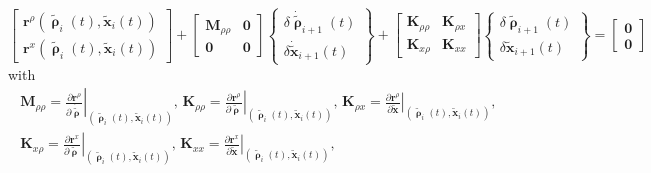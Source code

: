 \documentclass[11pt]{acmeArticle}
\numberwithin{equation}{section}
\begin{document}
\begin{equation}
	\left[
		\begin{array}{c}
			\mathbf{r}^\rho(\tilde{\pmb\uprho}_i(t), \tilde{\mathbf{x}}_i(t))\\
			\mathbf{r}^x(\tilde{\pmb\uprho}_i(t), \tilde{\mathbf{x}}_i(t))
		\end{array}
	\right]
	+
	\left[
	\begin{array}{cc}
		\mathbf{M}_{\rho\rho} & \mathbf{0}\\
		\mathbf{0} & \mathbf{0}
	\end{array}
	\right]
	\left\{
		\begin{array}{c}
		\delta\dot{\tilde{\pmb\uprho}}_{i+1}(t)\\
		\delta\dot{\tilde{\mathbf{x}}}_{i+1}(t)
		\end{array}
	\right\}
	+
	\left[
		\begin{array}{cc}
			\mathbf{K}_{\rho\rho} & \mathbf{K}_{\rho x}\\
			\mathbf{K}_{x\rho} & \mathbf{K}_{xx}
		\end{array}
		\right]
		\left\{
			\begin{array}{c}
			\delta\tilde{\pmb\uprho}_{i+1}(t)\\
			\delta\tilde{\mathbf{x}}_{i+1}(t)
			\end{array}
		\right\}
		=
		\left[
			\begin{array}{c}
				\mathbf{0}\\
				\mathbf{0}
			\end{array}
		\right]
		\label{eq:tangent_remodelling}
\end{equation}
with
\begin{equation}
\begin{split}
\mathbf{M}_{\rho\rho} = 
\left.
\frac{\partial \mathbf{r}^\rho}{\partial \dot{\tilde{\pmb\uprho}}}
\right|_{(\tilde{\pmb\uprho}_i(t),\tilde{\mathbf{x}}_i(t))},\,
\mathbf{K}_{\rho\rho} = 
\left.
\frac{\partial \mathbf{r}^\rho}{\partial {\tilde{\pmb\uprho}}}
\right|_{(\tilde{\pmb\uprho}_i(t),\tilde{\mathbf{x}}_i(t))},\,
\mathbf{K}_{\rho x} = 
\left.
\frac{\partial \mathbf{r}^\rho}{\partial {\tilde{\mathbf{x}}}}
\right|_{(\tilde{\pmb\uprho}_i(t),\tilde{\mathbf{x}}_i(t))},\,\\
\mathbf{K}_{x \rho} = 
\left.
\frac{\partial \mathbf{r}^x}{\partial {\tilde{\pmb\uprho}}}
\right|_{(\tilde{\pmb\uprho}_i(t),\tilde{\mathbf{x}}_i(t))},\,
\mathbf{K}_{x x} = 
\left.
\frac{\partial \mathbf{r}^x}{\partial {\tilde{\mathbf{x}}}}
\right|_{(\tilde{\pmb\uprho}_i(t),\tilde{\mathbf{x}}_i(t))},
\end{split}
\end{equation}
\end{document}
